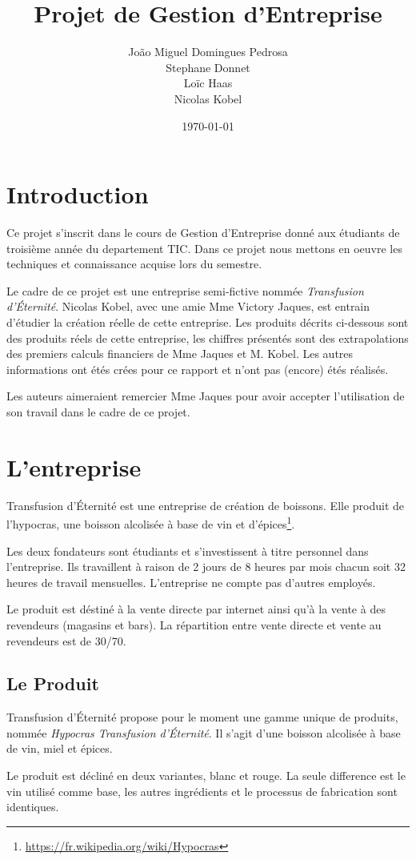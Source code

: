\documentclass[10pt,a4paper]{article}
\title{Projet de Gestion d'Entreprise}
\subtitle{\tde{}}
\author{João Miguel Domingues Pedrosa \\ Stephane Donnet \\ Loïc Haas \\ Nicolas Kobel}
\date{\today}
\newcommand{\tde}{Transfusion d'Éternité}
\begin{document}
\maketitle
\tableofcontents
\newpage
\section{Introduction}
Ce projet s'inscrit dans le cours de Gestion d'Entreprise donné aux étudiants de troisième année du departement TIC.
Dans ce projet nous mettons en oeuvre les techniques et connaissance acquise lors du semestre.

Le cadre de ce projet est une entreprise semi-fictive nommée \textit{\tde{}}.
Nicolas Kobel, avec une amie Mme Victory Jaques, est entrain d'étudier la création réelle de cette entreprise.
Les produits décrits ci-dessous sont des produits réels de cette entreprise, les chiffres présentés sont des extrapolations des premiers calculs financiers de Mme Jaques et M. Kobel.
Les autres informations ont étés crées pour ce rapport et n'ont pas (encore) étés réalisés.

Les auteurs aimeraient remercier Mme Jaques pour avoir accepter l'utilisation de son travail dans le cadre de ce projet.
\newpage
\section{L'entreprise}
\tde{} est une entreprise de création de boissons.
Elle produit de l'hypocras, une boisson alcolisée à base de vin et d'épices\footnote{\url{https://fr.wikipedia.org/wiki/Hypocras}}.

Les deux fondateurs sont étudiants et s'investissent à titre personnel dans l'entreprise.
Ils travaillent à raison de 2 jours de 8 heures par mois chacun soit 32 heures de travail mensuelles.
L'entreprise ne compte pas d'autres employés.

Le produit est déstiné à la vente directe par internet ainsi qu'à la vente à des revendeurs (magasins et bars).
La répartition entre vente directe et vente au revendeurs est de 30/70.
\subsection{Le Produit}
\tde{} propose pour le moment une gamme unique de produits, nommée \textit{Hypocras \tde{}}.
Il s'agit d'une boisson alcolisée à base de vin, miel et épices.

Le produit est décliné en deux variantes, blanc et rouge.
La seule difference est le vin utilisé comme base, les autres ingrédients et le processus de fabrication sont identiques.
\end{document}
